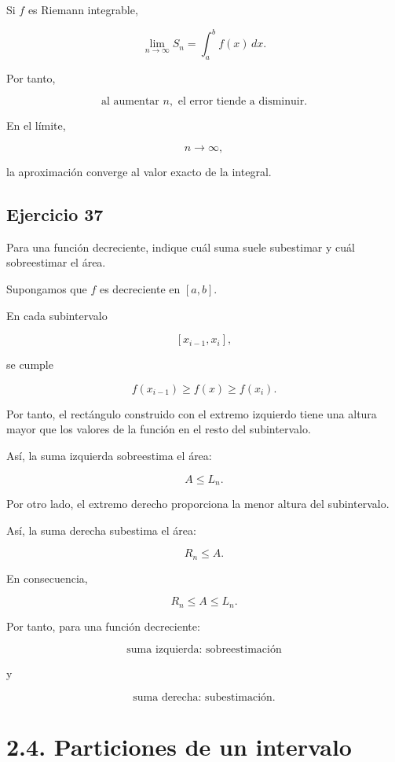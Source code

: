 \documentclass[12pt]{article}
\begin{document}
Si \(f\) es Riemann integrable,

\[
\lim_{n\to\infty}S_n
=
\int_a^bf(x)\,dx.
\]

Por tanto,

\[
\boxed{
\text{al aumentar }n,\text{ el error tiende a disminuir}
}.
\]

En el límite,

\[
n\to\infty,
\]

la aproximación converge al valor exacto de la integral.

\subsection*{Ejercicio 37}

Para una función decreciente, indique cuál suma suele subestimar y cuál
sobreestimar el área.

Supongamos que \(f\) es decreciente en \([a,b]\).

En cada subintervalo

\[
[x_{i-1},x_i],
\]

se cumple

\[
f(x_{i-1})\geq f(x)\geq f(x_i).
\]

Por tanto, el rectángulo construido con el extremo izquierdo tiene una
altura mayor que los valores de la función en el resto del subintervalo.

Así, la suma izquierda sobreestima el área:

\[
A\leq L_n.
\]

Por otro lado, el extremo derecho proporciona la menor altura del
subintervalo.

Así, la suma derecha subestima el área:

\[
R_n\leq A.
\]

En consecuencia,

\[
\boxed{
R_n\leq A\leq L_n
}.
\]

Por tanto, para una función decreciente:

\[
\boxed{
\text{suma izquierda: sobreestimación}
}
\]

y

\[
\boxed{
\text{suma derecha: subestimación}
}.
\]

\section*{2.4. Particiones de un intervalo}
\end{document}
